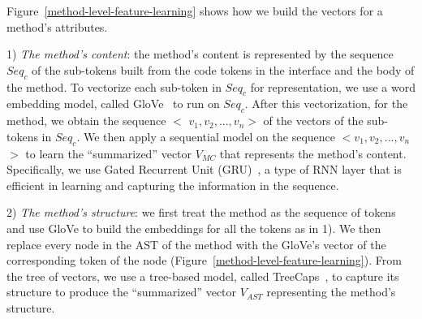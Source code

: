 Figure~\ref{method-level-feature-learning} shows how we build the
vectors for a method's attributes.


1) {\em The method's content}: the method's content is
represented by the sequence $Seq_c$ of the sub-tokens built from the
code tokens in the interface and the body of the method. To vectorize
each sub-token in $Seq_c$ for representation, we use a word embedding
model, called GloVe~\cite{glove2014} to run on $Seq_c$. After this
vectorization, for the method, we obtain the sequence $<$ $v_1, v_2,
..., v_n$$>$ of the vectors of the sub-tokens in $Seq_c$.  We then
apply a sequential model on the sequence $<$$v_1,v_2,...,v_n$$>$ to
learn the ``summarized'' vector $V_{MC}$ that represents the method's
content. Specifically, we use Gated Recurrent Unit
(GRU)~\cite{cho2014learning}, a type of RNN layer that is efficient in
learning and capturing the information in the sequence.


2) {\em The method's structure}: we first treat the
method as the sequence of tokens and use GloVe to build
the embeddings for all the tokens as in 1). We then replace every node
in the AST of the method with the GloVe's vector of the corresponding
token of the node (Figure~\ref{method-level-feature-learning}).  From
the tree of vectors, we use a tree-based model, called
TreeCaps~\cite{bui2021treecaps}, to capture its structure to
produce the ``summarized'' vector $V_{AST}$ representing the
method's structure.

